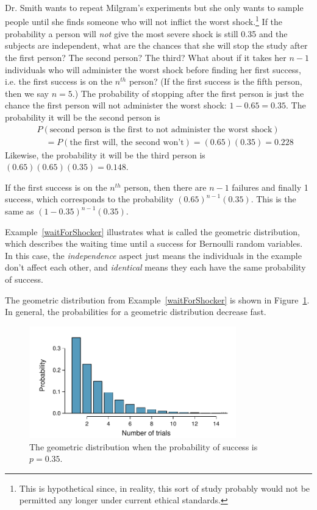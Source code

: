 \begin{example}{Dr. Smith wants to repeat Milgram's experiments but she only wants to sample people until she finds someone who will not inflict the worst shock.\footnote{This is hypothetical since, in reality, this sort of study probably would not be permitted any longer under current ethical standards.} If the probability a person will \emph{not} give the most severe shock is still 0.35 and the subjects are independent, what are the chances that she will stop the study after the first person? The second person? The third? What about if it takes her $n-1$ individuals who will administer the worst shock before finding her first success, i.e. the first success is on the $n^{th}$ person? (If the first success is the fifth person, then we say $n=5$.)} \label{waitForShocker}
The probability of stopping after the first person is just the chance the first person will not administer the worst shock: $1-0.65=0.35$. The probability it will be the second person is
\begin{eqnarray*}
&&P(\text{second person is the first to not administer the worst shock}) \\
&&\quad = P(\text{the first will, the second won't}) = (0.65)(0.35) = 0.228
\end{eqnarray*}
Likewise, the probability it will be the third person is $(0.65)(0.65)(0.35) = 0.148$.

If the first success is on the $n^{th}$ person, then there are $n-1$ failures and finally 1 success, which corresponds to the probability $(0.65)^{n-1}(0.35)$. This is the same as $(1-0.35)^{n-1}(0.35)$.
\end{example}

Example~\ref{waitForShocker} illustrates what is called the geometric distribution, which describes the waiting time until a success for  Bernoulli random variables. In this case, the \emph{independence} aspect just means the individuals in the example don't affect each other, and \emph{identical} means they each have the same probability of success.

The geometric distribution from Example~\ref{waitForShocker} is shown in Figure~\ref{geometricDist35}. In general, the probabilities for a geometric distribution decrease  fast.

\begin{figure}[H]
\centering
\includegraphics[width=0.8\textwidth]{03/figures/geometricDist35/geometricDist35}
\caption{The geometric distribution when the probability of success is $p=0.35$.}
\label{geometricDist35}
\end{figure}

